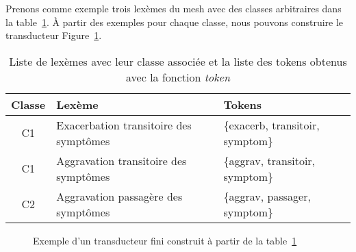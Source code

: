 \begin{example}
    \label{ex:fst}
    Prenons comme exemple trois lexèmes du \gls{mesh} avec des classes arbitraires dans la table~\ref{tab:fst-ex}.
    À partir des exemples pour chaque classe, nous pouvons construire le transducteur Figure~\ref{fig:fst-ex}.

    \begin{table}[htb]
        \centering
        \begin{tabular}{cll}
            Classe & Lexème                                 & Tokens                           \\
            \hline
            C1     & Exacerbation transitoire des symptômes & \{exacerb, transitoir, symptom\} \\
            C1     & Aggravation transitoire des symptômes  & \{aggrav,  transitoir, symptom\} \\
            C2     & Aggravation passagère des symptômes    & \{aggrav,  passager,   symptom\} \\
        \end{tabular}
        \caption{Liste de lexèmes avec leur classe associée et la liste des tokens obtenus avec la fonction \textit{token}}
        \label{tab:fst-ex}
    \end{table}

    \begin{figure}[!htb]
        \small
        \centering
        \caption[Exemple d'un transducteur fini]{Exemple d'un transducteur fini construit à partir de la table~\ref{tab:fst-ex}}
        \label{fig:fst-ex}
    \end{figure}
\end{example}

